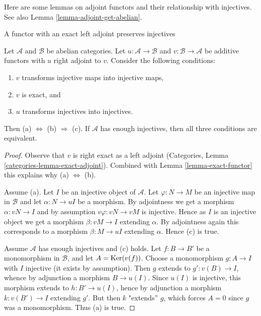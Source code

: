 \noindent
Here are some lemmas on adjoint functors and their relationship with
injectives. See also Lemma \ref{lemma-adjoint-get-abelian}.

\begin{lemma}
\label{lemma-adjoint-preserve-injectives}
\begin{slogan}
A functor with an exact left adjoint preserves injectives
\end{slogan}
Let $\mathcal{A}$ and $\mathcal{B}$ be abelian categories.
Let $u : \mathcal{A} \to \mathcal{B}$ and
$v : \mathcal{B} \to \mathcal{A}$ be additive functors with
$u$ right adjoint to $v$. Consider the following conditions:
\begin{enumerate}
\item[(a)] $v$ transforms injective maps into injective maps,
\item[(b)] $v$ is exact, and
\item[(c)] $u$ transforms injectives into injectives.
\end{enumerate}
Then (a) $\Leftrightarrow$ (b) $\Rightarrow$ (c). If $\mathcal{A}$
has enough injectives, then all three conditions are equivalent.
\end{lemma}

\begin{proof}
Observe that $v$ is right exact as a left adjoint (Categories, Lemma
\ref{categories-lemma-exact-adjoint}). Combined with
Lemma \ref{lemma-exact-functor} this explains why (a) $\Leftrightarrow$ (b).

\medskip\noindent
Assume (a). Let $I$ be an injective object of $\mathcal{A}$.
Let $\varphi : N \to M$ be an injective map in $\mathcal{B}$ and let
$\alpha : N \to uI$ be a morphism.
By adjointness we get a morphism $\alpha : vN \to I$ and
by assumption $v\varphi : vN \to vM$ is injective.
Hence as $I$ is an injective object we get a morphism
$\beta : vM \to I$ extending $\alpha$. By adjointness
again this corresponds to a morphism $\beta : M \to uI$ extending $\alpha$.
Hence (c) is true.

\medskip\noindent
Assume $\mathcal{A}$ has enough injectives and (c) holds.
Let  $f : B \to B'$ be a monomorphism in $\mathcal{B}$, and let
$A = \mathop{\mathrm{Ker}}(v(f))$. Choose a monomorphism $g : A \to I$ with $I$ injective
(it exists by assumption). Then $g$ extends to $g' : v(B) \to I$,
whence by adjunction a morphism $B \to u(I)$. Since $u(I)$ is injective,
this morphism extends to $h : B' \to u(I)$, hence by adjunction a morphism
$k : v(B') \to I$ extending $g'$. But then $k$ "extends'' $g$,
which forces $A = 0$ since $g$ was a monomorphism. Thus (a) is true.
\end{proof}

